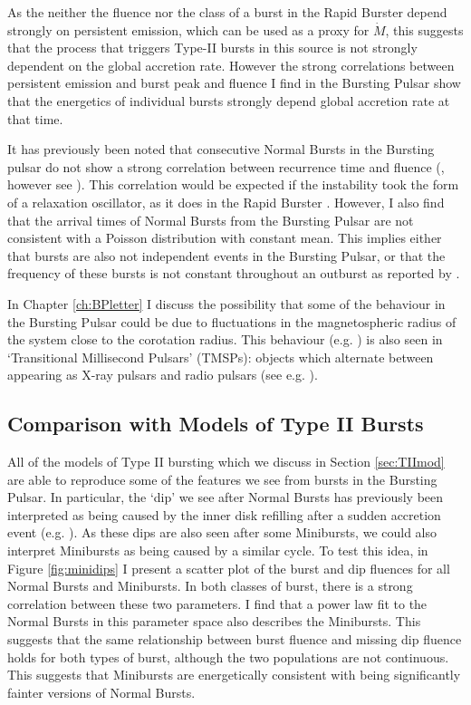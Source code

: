 \par As the neither the fluence nor the class of a burst in the Rapid Burster depend strongly on persistent emission, which can be used as a proxy for $\dot{M}$, this suggests that the process that triggers Type-II bursts in this source is not strongly dependent on the global accretion rate.  However the strong correlations between persistent emission and burst peak and fluence I find in the Bursting Pulsar show that the energetics of individual bursts strongly depend global accretion rate at that time.
\par It has previously been noted that consecutive Normal Bursts in the Bursting pulsar do not show a strong correlation between recurrence time and fluence (\citealp{Taam_Evo,Lewin_BP}, however see \citealp{Aptekar_OscRel}).  This correlation would be expected if the instability took the form of a relaxation oscillator, as it does in the Rapid Burster \citep{Lewin_TypeII}.  However, I also find that the arrival times of Normal Bursts from the Bursting Pulsar are not consistent with a Poisson distribution with constant mean.  This implies either that bursts are also not independent events in the Bursting Pulsar, or that the frequency of these bursts is not constant throughout an outburst as reported by \citet{Aptekar_Recur}.
\par In Chapter \ref{ch:BPletter} I discuss the possibility that some of the behaviour in the Bursting Pulsar could be due to fluctuations in the magnetospheric radius of the system close to the corotation radius.  This behaviour (e.g. \citealp{Bogdanov_TMSPVar,Ferrigno_TMSPVar}) is also seen in `Transitional Millisecond Pulsars' (TMSPs): objects which alternate between appearing as X-ray pulsars and radio pulsars (see e.g. \citealp{Archibald_Link,Papitto_Swings}).

\subsection{Comparison with Models of Type II Bursts}

\label{sec:mod}

\par All of the models of Type II bursting which we discuss in Section \ref{sec:TIImod} are able to reproduce some of the features we see from bursts in the Bursting Pulsar.  In particular, the `dip' we see after Normal Bursts has previously been interpreted as being caused by the inner disk refilling after a sudden accretion event (e.g. \citealp{Younes_Expo}).  As these dips are also seen after some Minibursts, we could also interpret Minibursts as being caused by a similar cycle.  To test this idea, in Figure \ref{fig:minidips} I present a scatter plot of the burst and dip fluences for all Normal Bursts and Minibursts.  In both classes of burst, there is a strong correlation between these two parameters.  I find that a power law fit to the Normal Bursts in this parameter space also describes the Minibursts.  This suggests that the same relationship between burst fluence and missing dip fluence holds for both types of burst, although the two populations are not continuous.  This suggests that Minibursts are energetically consistent with being significantly fainter versions of Normal Bursts.

